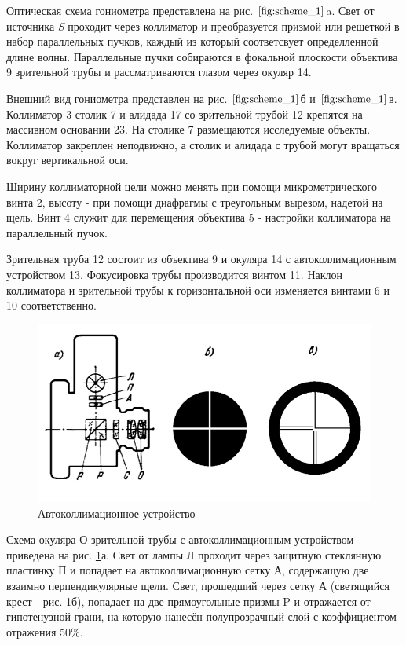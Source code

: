 	Оптическая схема гониометра представлена на рис. $\ref{fig:scheme_1}$a. Свет от источника \textit{S} проходит через коллиматор и преобразуется призмой или решеткой в набор параллельных пучков, каждый из который соответсвует определленной длине волны. Параллельные пучки собираются в фокальной плоскости объектива 9 зрительной трубы и рассматриваются глазом через окуляр 14.
	
	Внешний вид гониометра представлен на рис. $\ref{fig:scheme_1}$б и $\ref{fig:scheme_1}$в. Коллиматор 3 столик 7 и алидада 17 со зрительной трубой 12 крепятся на массивном основании 23. На столике 7 размещаются исследуемые объекты. Коллиматор закреплен неподвижно, а столик и алидада с трубой могут вращаться вокруг вертикальной оси.
	
	Ширину коллиматорной цели можно менять при помощи микрометрического винта 2, высоту - при помощи диафрагмы с треугольным вырезом, надетой на щель. Винт 4 служит для перемещения объектива 5 - настройки коллиматора на параллельный пучок.
	
	Зрительная труба 12 состоит из объектива 9 и окуляра 14 с автоколлимационным устройством 13. Фокусировка трубы производится винтом 11. Наклон коллиматора и зрительной трубы к горизонтальной оси изменяется винтами 6 и 10 соответственно.
	
	\begin{figure}
		\includegraphics[scale=0.6]{images/scheme_2.png}
		\caption{Автоколлимационное устройство}
		\label{fig:scheme_2}
	\end{figure}
	
	Схема окуляра О зрительной трубы с автоколлимационным устройством приведена на рис. \ref{fig:scheme_2}а. Свет от лампы Л проходит через защитную стеклянную пластинку П и попадает на автоколлимационную сетку А, содержащую две взаимно перпендикулярные щели. Свет, прошедший через сетку А (светящийся крест - рис. \ref{fig:scheme_2}б), попадает на две прямоугольные призмы P и отражается от гипотенузной грани, на которую нанесён полупрозрачный слой с коэффициентом отражения 50\%.
	
